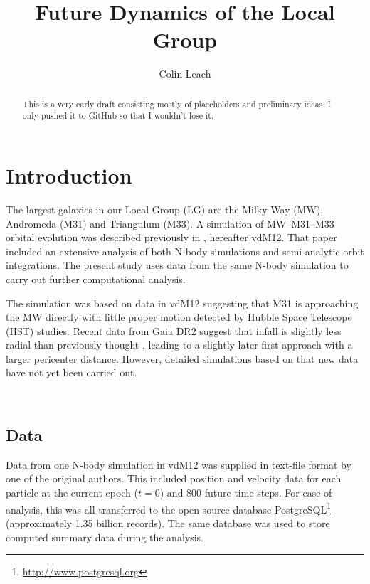 \documentclass[twocolumn]{aastex63}
\newcommand{\todo}{\color{red}{TODO}\color{black}\hspace{2mm}}
\begin{document}
	
\title{Future Dynamics of the Local Group}

\author[0000-0003-3608-1546]{Colin Leach}

\begin{abstract}
	
\color{red}This is a very early draft consisting mostly of placeholders and preliminary ideas. I only pushed it to GitHub so that I wouldn't lose it.\color{black}

\end{abstract}


\section{Introduction}

The largest galaxies in our Local Group (LG) are the Milky Way (MW), Andromeda (M31) and Triangulum (M33).  A simulation of MW--M31--M33 orbital evolution was described previously in \citet{marel_m31_2012}, hereafter vdM12. That paper included an extensive analysis of both N-body simulations and semi-analytic orbit integrations. The present study uses data from the same N-body simulation to carry out further computational analysis.

The simulation was based on data in vdM12 suggesting that M31 is approaching the MW directly with little proper motion detected by Hubble Space Telescope (HST) studies. Recent data from Gaia DR2 \citep{brown_gaia_2018} suggest that infall is slightly less radial than previously thought \citep{marel_first_2019}, leading to a slightly later first approach with a larger pericenter distance. However, detailed simulations based on that new data have not yet been carried out.

\todo{structure of the paper}\ 

\subsection{Data}

Data from one N-body simulation in vdM12 was supplied in text-file format by one of the original authors. This included position and velocity data for each particle at the current epoch ($t=0$) and 800 future time steps. For ease of analysis, this was all transferred to the open source database PostgreSQL\footnote{\url{http://www.postgresql.org}} (approximately 1.35 billion records). The same database was used to store computed summary data during the analysis.
\end{document}
